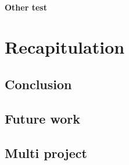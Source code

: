       \subsubsection{Other test}

\chapter{Recapitulation}
  \section{Conclusion}
  \section{Future work}
  \section{Multi project} %




\appendix


